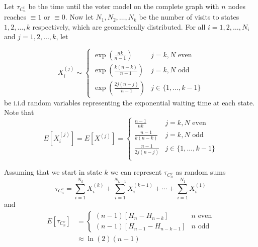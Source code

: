 \begin{theorem}
Let $\tau_{C_n^{v}}$ be the time until the voter model on the complete graph with $n$ nodes reaches $\equiv 1$ or $\equiv 0$.
Now let $N_1, N_2, \ldots, N_k$ be the number of visits to states $1, 2, \ldots, k$ respectively, which are geometrically distributed.
For all $i = 1,2,\ldots, N_i$ and $j = 1,2,\ldots, k$, let 

$$
X_i^{(j)} \sim \begin{cases}
  \exp\left(\displaystyle \frac{nk}{n - 1}\right) & j = k, N \text{ even}\\[10pt]
  \exp\left(\displaystyle\frac{k (n - k)}{n - 1}\right) & j = k, N \text{ odd}\\[10pt]
  \exp\left(\displaystyle \frac{2j (n - j)}{n - 1}\right) & j \in \{1, \ldots, k-1\}
\end{cases}
$$
be i.i.d random variables representing the exponential waiting time at each state. Note that
$$
E[X_i^{(j)}] = E[X^{(j)}] = \begin{cases}
  \displaystyle \frac{n - 1}{nk} & j = k, N \text{ even}\\[10pt]
  \displaystyle \frac{n - 1}{k (n - k)} & j = k, N \text{ odd}\\[10pt]
  \displaystyle \frac{n - 1}{2j (n - j)} & j \in \{1,\ldots, k - 1\}\\
\end{cases}
$$

Assuming that we start in state $k$ we can represent $\tau_{C_n^{v}}$ as random sums
\begin{equation}\label{eq:wait_contact_sum_voter}
    \tau_{C_n^{v}} = \sum_{i = 1}^{N_k} X_i^{(k)} + \sum_{i = 1}^{N_{k - 1}} X_i^{(k - 1)} + \cdots + \sum_{i = 1}^{N_1} X_i^{(1)}
\end{equation}
and
\begin{align*}
E[\tau_{C_n^{v}}] &= \begin{cases}
    (n - 1) \left[H_{n} - H_{n - k}\right] & n \text{ even}\\
    (n - 1) \left[H_{n - 1} - H_{n - k - 1}\right] & n \text{ odd}
\end{cases}\\
    &\approx \ln(2) (n - 1)
\end{align*}
\end{theorem}

